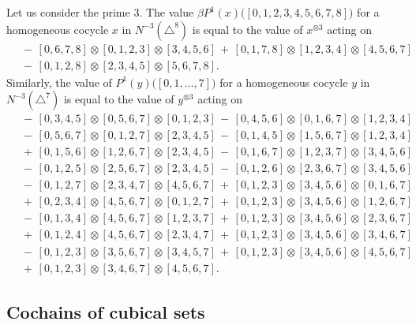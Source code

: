 \begin{example}
	Let us consider the prime $3$. The value $\beta P^1(x)\big([0,1,2,3,4,5,6,7,8]\big)$ for a homogeneous cocycle $x$ in $N^{-3}(\triangle^8)$ is equal to the value of $x^{\otimes 3}$ acting on
	\begin{align*}
	& \,-\, [0, 6, 7, 8] \otimes [0, 1, 2, 3] \otimes [3, 4, 5, 6] \,+\, [0, 1, 7, 8] \otimes [1, 2, 3, 4] \otimes [4, 5, 6, 7] \\ & \,-\, [0, 1, 2, 8] \otimes [2, 3, 4, 5] \otimes [5, 6, 7, 8].
	\end{align*}
	Similarly, the value of $P^1(y)\big([0,1,\dots,7]\big)$ for a homogeneous cocycle $y$ in $N^{-3}(\triangle^7)$ is equal to the value of $y^{\otimes 3}$ acting on
	\begin{align*}
	& \,-\, [0,3,4,5] \otimes [0,5,6,7] \otimes [0,1,2,3] \,-\, [0,4,5,6] \otimes [0,1,6,7] \otimes [1,2,3,4] \\ & \,-\, [0,5,6,7] \otimes [0,1,2,7] \otimes [2,3,4,5] \,-\, [0,1,4,5] \otimes [1,5,6,7] \otimes [1,2,3,4] \\ & \,+\, [0,1,5,6] \otimes [1,2,6,7] \otimes [2,3,4,5] \,-\, [0,1,6,7] \otimes [1,2,3,7] \otimes [3,4,5,6] \\ & \,-\, [0,1,2,5] \otimes [2,5,6,7] \otimes [2,3,4,5] \,-\, [0,1,2,6] \otimes [2,3,6,7] \otimes [3,4,5,6] \\ & \,-\, [0,1,2,7] \otimes [2,3,4,7] \otimes [4,5,6,7] \,+\, [0,1,2,3] \otimes [3,4,5,6] \otimes [0,1,6,7] \\ & \,+\, [0,2,3,4] \otimes [4,5,6,7] \otimes [0,1,2,7] \,+\, [0,1,2,3] \otimes [3,4,5,6] \otimes [1,2,6,7] \\ & \,-\, [0,1,3,4] \otimes [4,5,6,7] \otimes [1,2,3,7] \,+\, [0,1,2,3] \otimes [3,4,5,6] \otimes [2,3,6,7] \\ & \,+\, [0,1,2,4] \otimes [4,5,6,7] \otimes [2,3,4,7] \,+\, [0,1,2,3] \otimes [3,4,5,6] \otimes [3,4,6,7] \\ & \,-\, [0,1,2,3] \otimes [3,5,6,7] \otimes [3,4,5,7] \,+\, [0,1,2,3] \otimes [3,4,5,6] \otimes [4,5,6,7] \\ & \,+\, [0,1,2,3] \otimes [3,4,6,7] \otimes [4,5,6,7].
	\end{align*}
\end{example}

\subsection{Cochains of cubical sets}

